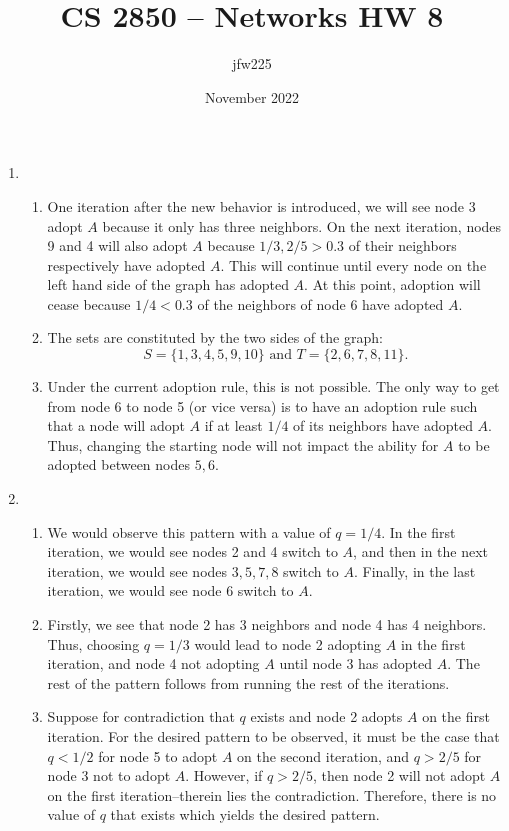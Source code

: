 \documentclass{article}
\title{CS 2850 -- Networks HW 8}
\author{jfw225}
\date{November 2022}
\begin{document}
\maketitle

\begin{enumerate}
   \item \begin{enumerate}
        \item One iteration after the new behavior is introduced, we will see node 3 adopt $A$ because it only has three neighbors. On the next iteration, nodes 9 and 4 will also adopt $A$ because $1/3,2/5>0.3$ of their neighbors respectively have adopted $A$. This will continue until every node on the left hand side of the graph has adopted $A$. At this point, adoption will cease because $1/4<0.3$ of the neighbors of node 6 have adopted $A$.
        
        \item The sets are constituted by the two sides of the graph:
        $$S=\{1,3,4,5,9,10\}\text{ and }T=\{2,6,7,8,11\}.$$

        \item Under the current adoption rule, this is not possible. The only way to get from node 6 to node 5 (or vice versa) is to have an adoption rule such that a node will adopt $A$ if at least $1/4$ of its neighbors have adopted $A$. Thus, changing the starting node will not impact the ability for $A$ to be adopted between nodes $5,6$.
   \end{enumerate}

   \item \begin{enumerate}
        \item We would observe this pattern with a value of $q=1/4$. In the first iteration, we would see nodes 2 and 4 switch to $A$, and then in the next iteration, we would see nodes $3,5,7,8$ switch to $A$. Finally, in the last iteration, we would see node 6 switch to $A$.
        \item Firstly, we see that node 2 has 3 neighbors and node 4 has 4 neighbors. Thus, choosing $q=1/3$ would lead to node 2 adopting $A$ in the first iteration, and node 4 not adopting $A$ until node $3$ has adopted $A$. The rest of the pattern follows from running the rest of the iterations.
        \item Suppose for contradiction that $q$ exists and node 2 adopts $A$ on the first iteration. For the desired pattern to be observed, it must be the case that $q<1/2$ for node 5 to adopt $A$ on the second iteration, and $q>2/5$ for node 3 not to adopt $A$. However, if $q>2/5$, then node 2 will not adopt $A$ on the first iteration--therein lies the contradiction. Therefore, there is no value of $q$ that exists which yields the desired pattern. 
   \end{enumerate}


\end{enumerate}
\end{document}
